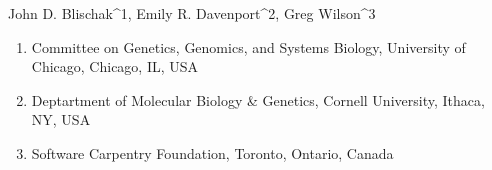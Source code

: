 John D. Blischak^{1}, Emily R. Davenport^{2}, Greg Wilson^{3}

\begin{enumerate}
\item Committee on Genetics, Genomics, and Systems Biology, University of Chicago, Chicago, IL, USA
\item Deptartment of Molecular Biology & Genetics, Cornell University, Ithaca, NY, USA
\item Software Carpentry Foundation, Toronto, Ontario, Canada
\end{enumerate}
